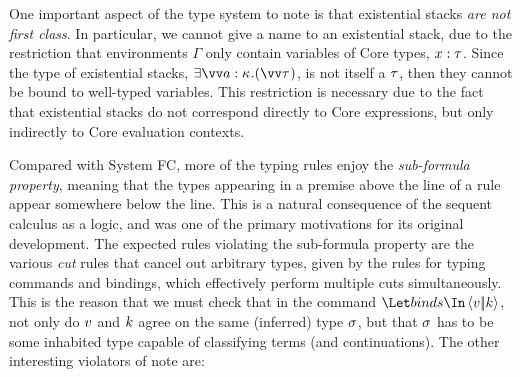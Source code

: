 \documentclass{article}
\begin{document}
One important aspect of the type system to note is that existential stacks
\emph{are not first class}.  In particular, we cannot give a name to an
existential stack, due to the restriction that environments $\Gamma$ only
contain variables of Core types, $x : \tau$.  Since the type of existential
stacks, $\stackty{\vect{a:\ki}}{\vect{\ty}}$, is not itself a $\tau$, then they
cannot be bound to well-typed variables.  This restriction is necessary due to
the fact that existential stacks do not correspond directly to Core expressions,
but only indirectly to Core evaluation contexts.

Compared with System FC, more of the typing rules enjoy the
\emph{sub-formula property}, meaning that the types appearing in a premise above
the line of a rule appear somewhere below the line.  This is a natural
consequence of the sequent calculus as a logic, and was one of the primary
motivations for its original development.  The expected rules violating the
sub-formula property are the various \emph{cut} rules that cancel out arbitrary
types, given by the rules for typing commands and bindings, which effectively
perform multiple cuts simultaneously.  This is the reason that we must check
that in the command $\mcut{\tm}{\ko}{\binds}$, not only do $v$ and $k$ agree
on the same (inferred) type $\sigma$, but that $\sigma$ has to be some inhabited
type capable of classifying terms (and continuations).  The other interesting
violators of note are:
\end{document}
